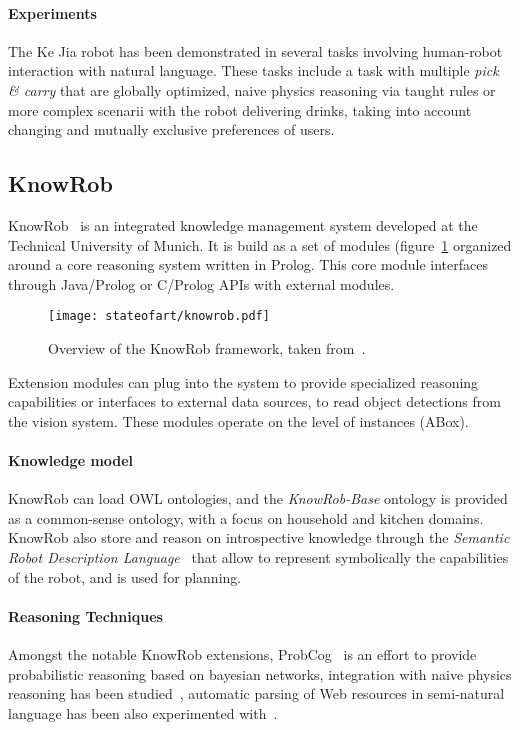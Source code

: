 \paragraph{Experiments} The Ke Jia robot has been demonstrated in several tasks
involving human-robot interaction with natural language. These tasks include a
task with multiple \emph{pick \& carry} that are globally optimized, naive
physics reasoning via taught rules or more complex scenarii with the robot
delivering drinks, taking into account changing and mutually exclusive
preferences of users.


\subsection{KnowRob}
\label{sect|knowrob}


{\sc KnowRob}~\cite{Tenorth2009a} is an integrated knowledge management system
developed at the Technical University of Munich. It is build as a set of
modules (figure~\ref{fig|knowrob} organized around a core reasoning system
written in Prolog. This core module interfaces through Java/Prolog or
C/Prolog APIs with external modules.

\begin{figure}
    \centering
    \texttt{[image: stateofart/knowrob.pdf]}

    \caption{Overview of the {\sc KnowRob} framework, taken
    from~\cite{Tenorth2011}.}

    \label{fig|knowrob}
\end{figure}

Extension modules can plug into the system to provide specialized reasoning
capabilities or interfaces to external data sources, \eg to read object
detections from the vision system. These modules operate on the level of
instances (ABox).

\paragraph{Knowledge model} {\sc KnowRob} can load OWL ontologies, and the
\emph{KnowRob-Base} ontology is provided as a common-sense ontology, with a
focus on household and kitchen domains. {\sc KnowRob} also store and reason on
introspective knowledge through the \emph{Semantic Robot Description
Language}~\cite{Kunze2011} that allow to represent symbolically the
capabilities of the robot, and is used for planning.


\paragraph{Reasoning Techniques} Amongst the notable {\sc KnowRob} extensions,
{\sc ProbCog}~\cite{Jain2009} is an effort to provide probabilistic reasoning
based on bayesian networks, integration with naive physics reasoning has been
studied~\cite{Kunze2011a}, automatic parsing of Web resources in semi-natural
language has been also experimented with~\cite{Nyga2009}.

